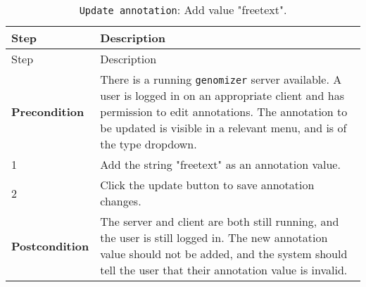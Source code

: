 \begin{longtable}[c]{@{}ll@{}}
\caption{\texttt{Update\ annotation}: Add value
"freetext".}\tabularnewline
\toprule
\begin{minipage}[b]{0.31\columnwidth}\raggedright\strut
Step
\strut\end{minipage} &
\begin{minipage}[b]{0.63\columnwidth}\raggedright\strut
Description
\strut\end{minipage}\tabularnewline
\midrule
\endfirsthead
\toprule
\begin{minipage}[b]{0.31\columnwidth}\raggedright\strut
Step
\strut\end{minipage} &
\begin{minipage}[b]{0.63\columnwidth}\raggedright\strut
Description
\strut\end{minipage}\tabularnewline
\midrule
\endhead
\begin{minipage}[t]{0.31\columnwidth}\raggedright\strut
\textbf{Precondition}
\strut\end{minipage} &
\begin{minipage}[t]{0.63\columnwidth}\raggedright\strut
There is a running \texttt{genomizer} server available. A user is logged
in on an appropriate client and has permission to edit annotations. The
annotation to be updated is visible in a relevant menu, and is of the
type dropdown.
\strut\end{minipage}\tabularnewline
\begin{minipage}[t]{0.31\columnwidth}\raggedright\strut
1
\strut\end{minipage} &
\begin{minipage}[t]{0.63\columnwidth}\raggedright\strut
Add the string "freetext" as an annotation value.
\strut\end{minipage}\tabularnewline
\begin{minipage}[t]{0.31\columnwidth}\raggedright\strut
2
\strut\end{minipage} &
\begin{minipage}[t]{0.63\columnwidth}\raggedright\strut
Click the update button to save annotation changes.
\strut\end{minipage}\tabularnewline
\begin{minipage}[t]{0.31\columnwidth}\raggedright\strut
\textbf{Postcondition}
\strut\end{minipage} &
\begin{minipage}[t]{0.63\columnwidth}\raggedright\strut
The server and client are both still running, and the user is still
logged in. The new annotation value should not be added, and the system
should tell the user that their annotation value is invalid.
\strut\end{minipage}\tabularnewline
\bottomrule
\end{longtable}

